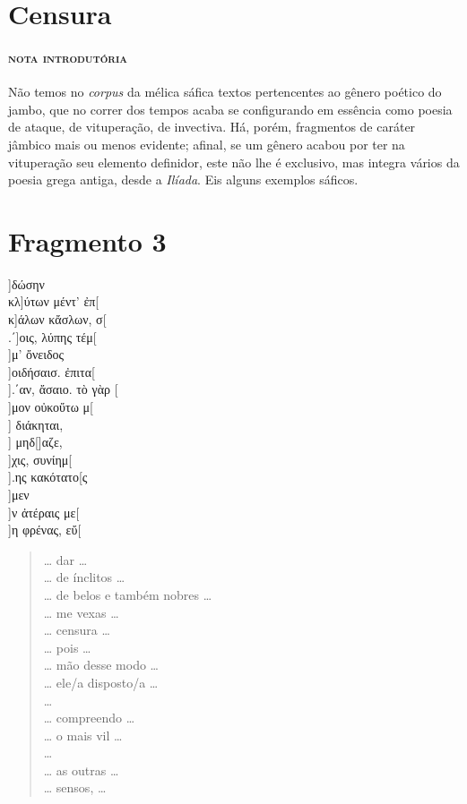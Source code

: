 \section{Censura}

\paragraph{\textsc{nota introdutória}}
Não temos no \textit{corpus }da mélica sáfica textos pertencentes ao gênero
poético do jambo, que no correr dos tempos acaba se configurando em essência como poesia de
ataque, de vituperação, de invectiva. Há, porém,
fragmentos de caráter jâmbico mais ou menos evidente; afinal, se um gênero
acabou por ter na vituperação seu elemento definidor, este não lhe é exclusivo,
mas integra vários da poesia grega antiga, desde a \textit{Ilíada}. Eis
alguns exemplos sáficos.

\section{Fragmento 3} 

\begin{gkverse}
]δώσην\\
κλ]ύτων μέντ’ ἐπ[\\
κ]άλων κἄσλων, σ[\\
.΄]οις, λύπης τέμ[\\
 ]μ’ ὄνειδος\\
]οιδήσαισ. ἐπιτα[\\
].΄αν, ἄσαιο. τὸ γὰρ [\\
]μον οὐκοὔτω μ[\\
] διάκηται,\\
  ] μηδ[\qquad    ]αζε,\\
  ]χις, συνίημ[\\ 
].ης κακότατο[ς\\
  ]μεν\\
  ]ν ἀτέραις με[\\
]η φρένας, εὔ[
\end{gkverse}
\pagebreak
\begin{verse}
\ldots{} dar \ldots{}\\
\ldots{} de ínclitos \ldots{}\\
\ldots{} de belos e também nobres \ldots{}\\
\ldots{} me vexas \ldots{}\\
\ldots{} censura \ldots{}\\
\ldots{} pois \ldots{}\\
\ldots{} mão desse modo \ldots{}\\
\ldots{} ele/a disposto/a \ldots{}\\
\ldots{}\\
\ldots{} compreendo \ldots{}\\
\ldots{} o mais vil \ldots{}\\
\ldots{}\\
\ldots{} as outras \ldots{}\\
\ldots{} sensos, \ldots{}
\end{verse}


